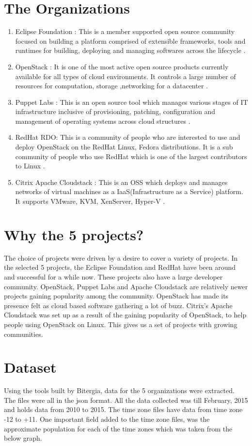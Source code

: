 \documentclass[double,12pt]{beavtex}
\begin{document}
\section{The Organizations}
\begin{enumerate}
\item Eclipse Foundation :
This is a member supported open source community focused on building a platform comprised of extensible frameworks, tools and runtimes for building, deploying and managing softwares across the lifecycle \cite{eclipse}.
\item OpenStack :
It is one of the most active open source products currently available for all types of cloud environments. It controls a large number of resources for computation, storage ,networking for a datacenter \cite{openstack}.
\item Puppet Labs :
This is an open source tool which manages various stages of IT infrastructure inclusive of provisioning, patching, configuration and management of operating systems across cloud structures \cite{puppet}.
\item RedHat RDO:
This is a community of people who are interested to use and deploy OpenStack on the RedHat Linux, Fedora distributions. It is a sub community of people who use RedHat which is one of the largest contributors to Linux \cite{rdo}.
\item Citrix Apache Cloudstack :
This is an OSS which deploys and manages networks of virtual machines as a IaaS(Infrastructure as a Service) platform. It supports VMware, KVM, XenServer, Hyper-V \cite{apache}.
\end{enumerate}

\section{Why the 5 projects?}
The choice of projects were driven by a desire to cover a variety of projects. In the selected 5 projects, the Eclipse Foundation and RedHat have been around and successful for a while now.
These projects also have a large developer community. OpenStack, Puppet Labs and Apache Cloudstack are relatively newer projects gaining popularity among the community. OpenStack has made its presence felt as cloud based software gathering a lot of buzz. Citrix's Apache Cloudstack was set up as a result of the gaining popularity of OpenStack, to help people using OpenStack on Linux. This gives us a set of projects with growing communities.

\section{Dataset}
Using the tools built by Bitergia, data for the 5 organizations were extracted. The files were all in the json format. All the data collected was till February, 2015 and
holds data from 2010 to 2015. The time zone files have data from time zone -12 to +11. One important field added to the time zone files, was the approximate population for each of the time zones which was taken from the below graph.
\end{document}
